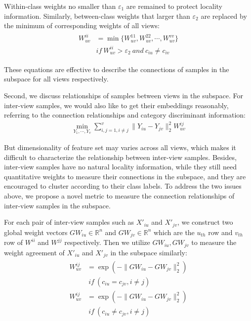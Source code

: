 \documentclass[journal]{IEEEtran}
\begin{document}
Within-class weights no smaller than $\varepsilon_1$ are remained to protect locality information. 
Similarly, between-class weights that larger than $\varepsilon_2$ are replaced by the minimum of corresponding weights of all views: 
\begin{align}
\begin{split}
W_{uv}^{ii}& = \min\{W_{uv}^{11}, W_{uv}^{22}, \cdots, W_{uv}^{vv} \}\\
&if\ W_{uv}^{ii} > \varepsilon_2\ and\ c_{iu}\neq c_{iv}
\end{split}
\end{align}

These equations are effective to describe the connections of samples in the subspace for all views respectively. 

Second, we discuss relationships of samples between views in the subspace. 
For inter-view samples, we would also like to get their embeddings reasonably, referring to the connection relationships and category discriminant information: 
\begin{gather}
\min_{Y_1,\cdots, Y_v} \sum_{i,j=1,i\neq j}^v \|Y_{iu}-Y_{jv} \|_2^2 W_{uv}^{ij}
\label{betweenview}
\end{gather}

But dimensionality of feature set may varies across all views, which makes it difficult to characterize the relationship between inter-view samples. 
Besides, inter-view samples have no natural locality information, while they still need quantitative weights to measure their connections in the subspace, and they are encouraged to cluster according to their class labels. 
To address the two issues above, we propose a novel metric to measure the connection relationships of inter-view samples in the subspace. 

For each pair of inter-view samples such as $X'_{iu}$ and $X'_{jv}$, we construct two global weight vectors $GW_{iu}\in \mathbb{R}^n$ and $GW_{jv}\in \mathbb{R}^n$ which are the $u_{th}$ row and $v_{th}$ row of $W^{ii}$ and $W^{jj}$ respectively. 
Then we utilize $GW_{iu},GW_{jv}$ to measure the weight agreement of $X'_{iu}$ and $X'_{jv}$ in the subspace similarly: 
\begin{align}
\begin{split}
W_{uv}^{ij}& = \exp(-{{\|GW_{iu}-GW_{jv}}\|_2^2})\\ 
&\ if \ (c_{iu}=c_{jv},i\neq j) \\
W_{uv}^{ij}& = \exp(-{{\|GW_{iu}-GW_{jv}}\|_2^2})\\ 
&\ if \ (c_{iu}\neq c_{jv},i\neq j)
\end{split}
\end{align}
\end{document}
